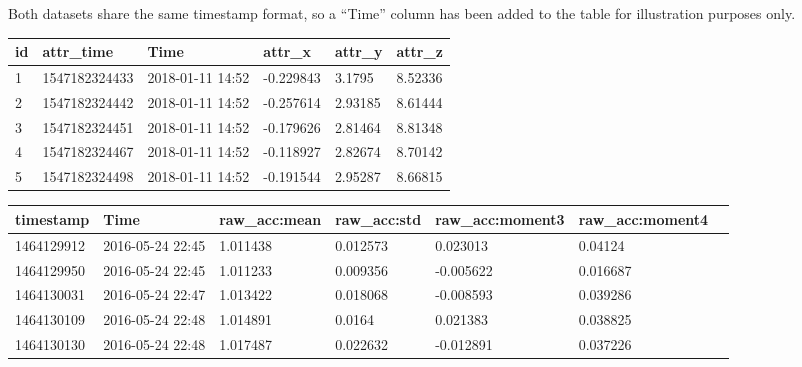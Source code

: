 \documentclass{UoNMCHA}
\newcommand{\inlineQuote}[1]{``#1''}
\numberwithin{equation}{section}
\begin{document}
Both datasets share the same timestamp format, so a \inlineQuote{Time} column has been added to the table for illustration purposes only.

 


\begin{table}[]\label{tab:ProjectData}
    \begin{center}
        \begin{tabular}{llllll}
        \hline\hline id & attr\_time & Time & attr\_x   & attr\_y & attr\_z \\ \hline
        1  & 1547182324433 & 2018-01-11 14:52 & -0.229843 & 3.1795  & 8.52336 \\
        2  & 1547182324442 & 2018-01-11 14:52 & -0.257614 & 2.93185 & 8.61444 \\
        3  & 1547182324451 & 2018-01-11 14:52 & -0.179626 & 2.81464 & 8.81348 \\
        4  & 1547182324467 & 2018-01-11 14:52 & -0.118927 & 2.82674 & 8.70142 \\
        5  & 1547182324498 & 2018-01-11 14:52 & -0.191544 & 2.95287 & 8.66815 \\ \hline
        \end{tabular}
    \end{center}
\end{table}


\begin{table}[]\label{tab:ExtraSensoryDataExample}
    \begin{center}
        \begin{tabular}{lllllll}
            \hline\hline timestamp  & Time & raw\_acc:mean & raw\_acc:std & raw\_acc:moment3 & raw\_acc:moment4 \\\hline 
        1464129912 & 2016-05-24 22:45 & 1.011438                       & 0.012573                      & 0.023013                          & 0.04124      \\
        1464129950 & 2016-05-24 22:45 & 1.011233                       & 0.009356                      & -0.005622                         & 0.016687     \\
        1464130031 & 2016-05-24 22:47 & 1.013422                       & 0.018068                      & -0.008593                         & 0.039286     \\
        1464130109 & 2016-05-24 22:48 & 1.014891                       & 0.0164                        & 0.021383                          & 0.038825     \\
        1464130130 & 2016-05-24 22:48 & 1.017487                       & 0.022632                      & -0.012891                         & 0.037226    \\\hline 
        \end{tabular}
    \end{center}
\end{table}
\end{document}
